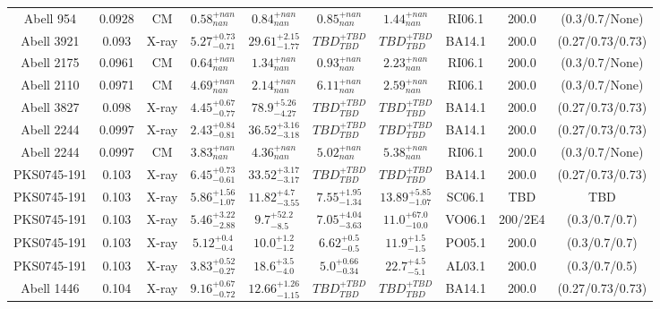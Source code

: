 \begin{table}
\begin{tabular}{cccccccccc}
Abell 954 & 0.0928 & CM & ${0.58}^{+nan}_{nan}$ & ${0.84}^{+nan}_{nan}$ & ${0.85}^{+nan}_{nan}$ & ${1.44}^{+nan}_{nan}$ & RI06.1 & 200.0 & (0.3/0.7/None) \\
Abell 3921 & 0.093 & X-ray & ${5.27}^{+0.73}_{-0.71}$ & ${29.61}^{+2.15}_{-1.77}$ & ${TBD}^{+TBD}_{TBD}$ & ${TBD}^{+TBD}_{TBD}$ & BA14.1 & 200.0 & (0.27/0.73/0.73) \\
Abell 2175 & 0.0961 & CM & ${0.64}^{+nan}_{nan}$ & ${1.34}^{+nan}_{nan}$ & ${0.93}^{+nan}_{nan}$ & ${2.23}^{+nan}_{nan}$ & RI06.1 & 200.0 & (0.3/0.7/None) \\
Abell 2110 & 0.0971 & CM & ${4.69}^{+nan}_{nan}$ & ${2.14}^{+nan}_{nan}$ & ${6.11}^{+nan}_{nan}$ & ${2.59}^{+nan}_{nan}$ & RI06.1 & 200.0 & (0.3/0.7/None) \\
Abell 3827 & 0.098 & X-ray & ${4.45}^{+0.67}_{-0.77}$ & ${78.9}^{+5.26}_{-4.27}$ & ${TBD}^{+TBD}_{TBD}$ & ${TBD}^{+TBD}_{TBD}$ & BA14.1 & 200.0 & (0.27/0.73/0.73) \\
Abell 2244 & 0.0997 & X-ray & ${2.43}^{+0.84}_{-0.81}$ & ${36.52}^{+3.16}_{-3.18}$ & ${TBD}^{+TBD}_{TBD}$ & ${TBD}^{+TBD}_{TBD}$ & BA14.1 & 200.0 & (0.27/0.73/0.73) \\
Abell 2244 & 0.0997 & CM & ${3.83}^{+nan}_{nan}$ & ${4.36}^{+nan}_{nan}$ & ${5.02}^{+nan}_{nan}$ & ${5.38}^{+nan}_{nan}$ & RI06.1 & 200.0 & (0.3/0.7/None) \\
PKS0745-191 & 0.103 & X-ray & ${6.45}^{+0.73}_{-0.61}$ & ${33.52}^{+3.17}_{-3.17}$ & ${TBD}^{+TBD}_{TBD}$ & ${TBD}^{+TBD}_{TBD}$ & BA14.1 & 200.0 & (0.27/0.73/0.73) \\
PKS0745-191 & 0.103 & X-ray & ${5.86}^{+1.56}_{-1.07}$ & ${11.82}^{+4.7}_{-3.55}$ & ${7.55}^{+1.95}_{-1.34}$ & ${13.89}^{+5.85}_{-1.07}$ & SC06.1 & TBD & TBD \\
PKS0745-191 & 0.103 & X-ray & ${5.46}^{+3.22}_{-2.88}$ & ${9.7}^{+52.2}_{-8.5}$ & ${7.05}^{+4.04}_{-3.63}$ & ${11.0}^{+67.0}_{-10.0}$ & VO06.1 & 200/2E4 & (0.3/0.7/0.7) \\
PKS0745-191 & 0.103 & X-ray & ${5.12}^{+0.4}_{-0.4}$ & ${10.0}^{+1.2}_{-1.2}$ & ${6.62}^{+0.5}_{-0.5}$ & ${11.9}^{+1.5}_{-1.5}$ & PO05.1 & 200.0 & (0.3/0.7/0.7) \\
PKS0745-191 & 0.103 & X-ray & ${3.83}^{+0.52}_{-0.27}$ & ${18.6}^{+3.5}_{-4.0}$ & ${5.0}^{+0.66}_{-0.34}$ & ${22.7}^{+4.5}_{-5.1}$ & AL03.1 & 200.0 & (0.3/0.7/0.5) \\
Abell 1446 & 0.104 & X-ray & ${9.16}^{+0.67}_{-0.72}$ & ${12.66}^{+1.26}_{-1.15}$ & ${TBD}^{+TBD}_{TBD}$ & ${TBD}^{+TBD}_{TBD}$ & BA14.1 & 200.0 & (0.27/0.73/0.73) \\

\end{tabular}
\end{table}
